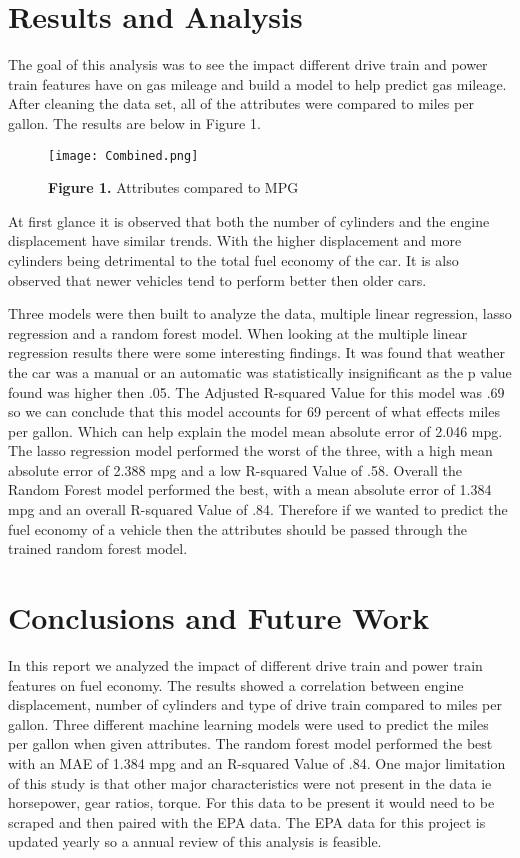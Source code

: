 \documentclass[runningheads]{llncs}
\begin{document}
\section{Results and Analysis}

The goal of this analysis was to see the impact different drive train and power train features have on gas mileage and build a model to help predict gas mileage. After cleaning the data set, all of the attributes were compared to miles per gallon. The results are below in Figure 1.


\begin{wrapfigure}
    \begin{center}
    \texttt{[image: Combined.png]}
    \caption{\textbf{Figure 1.} Attributes compared to MPG}
    \label{fig:Attributes}
    \end{center}
\end{wrapfigure}

At first glance it is observed that both the number of cylinders and the engine displacement have similar trends. With the higher displacement and more cylinders being detrimental to the total fuel economy of the car. It is also observed that newer vehicles tend to perform better then older cars.


Three models were then built to analyze the data, multiple linear regression, lasso regression and a random forest model. When looking at the multiple linear regression results there were some interesting findings. It was found that weather the car was a manual or an automatic was statistically insignificant as the p value found was higher then .05. The Adjusted R-squared Value for this model was .69 so we can conclude that this model accounts for 69 percent of what effects miles per gallon. Which can help explain the model mean absolute error of 2.046 mpg. The lasso regression model performed the worst of the three, with a high mean absolute error of 2.388 mpg and a low R-squared Value of .58. Overall the Random Forest model performed the best, with a mean absolute error of 1.384 mpg and an overall R-squared Value of .84. Therefore if we wanted to predict the fuel economy of a vehicle then the attributes should be passed through the trained random forest model. 

\section{Conclusions and Future Work}
In this report we analyzed the impact of different drive train and power train features on fuel economy. The results showed a correlation between engine displacement, number of cylinders and type of drive train compared to miles per gallon. Three different machine learning models were used to predict the miles per gallon when given attributes. The random forest model performed the best with an MAE of 1.384 mpg and an R-squared Value of .84. One major limitation of this study is that other major characteristics were not present in the data ie horsepower, gear ratios, torque. For this data to be present it would need to be scraped and then paired with the EPA data. The EPA data for this project is updated yearly so a annual review of this analysis is feasible.




\end{document}
